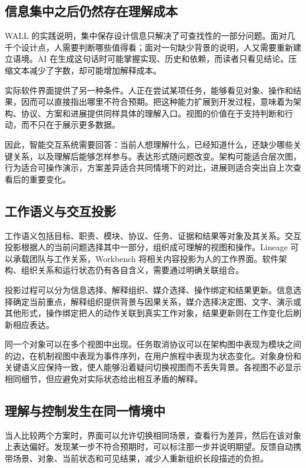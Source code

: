 \label{sec:interaction}
\subsection{信息集中之后仍然存在理解成本}
WALL 的实践说明，集中保存设计信息只解决了可查找性的一部分问题。面对几千个设计点，人需要判断哪些值得看；面对一句缺少背景的说明，人又需要重新建立语境。AI 在生成这句话时可能掌握实现、历史和依赖，而读者只看见结论。压缩文本减少了字数，却可能增加解释成本。

实际软件界面提供了另一种条件。人正在尝试某项任务，能够看见对象、操作和结果，因而可以直接指出哪里不符合预期。把这种能力扩展到开发过程，意味着为架构、协议、方案和进展提供同样具体的理解入口。视图的价值在于支持判断和行动，而不只在于展示更多数据。

因此，智能交互系统需要回答：当前人想理解什么，已经知道什么，还缺少哪些关键关系，以及理解后能够怎样参与。表达形式随问题改变。架构可能适合层次图，行为适合可操作演示，方案差异适合共同情境下的对比，进展则适合突出自上次查看后的重要变化。

\subsection{工作语义与交互投影}
工作语义包括目标、职责、模块、协议、任务、证据和结果等对象及其关系。交互投影根据人的当前问题选择其中一部分，组织成可理解的视图和操作。Lineage 可以承载团队与工作关系，Workbench 将相关内容投影为人的工作界面。软件架构、组织关系和运行状态仍有各自含义，需要通过明确关联组合。

投影过程可以分为信息选择、解释组织、媒介选择、操作绑定和结果更新。信息选择确定当前重点，解释组织提供背景与因果关系，媒介选择决定图、文字、演示或其他形式，操作绑定把人的动作关联到真实工作对象，结果更新则在工作变化后刷新相应表达。


同一个对象可以在多个视图中出现。任务取消协议可以在架构图中表现为模块之间的边，在机制视图中表现为事件序列，在用户旅程中表现为状态变化。对象身份和关键语义应保持一致，使人能够沿着疑问切换视图而不丢失背景。各视图不必显示相同细节，但应避免对实际状态给出相互矛盾的解释。

\subsection{理解与控制发生在同一情境中}
当人比较两个方案时，界面可以允许切换相同场景，查看行为差异，然后在该对象上表达偏好。发现某一步不符合预期时，可以标注那一步并说明期望。反馈自动携带场景、对象、当前状态和可见结果，减少人重新组织长段描述的负担。

